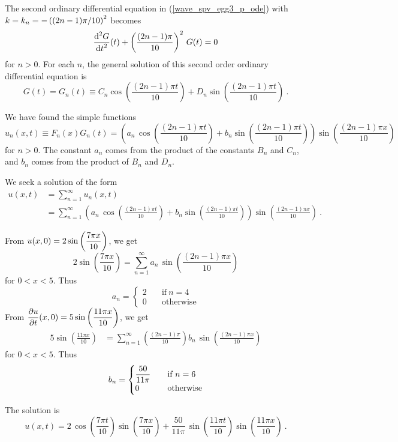 \begin{egg}
The second ordinary differential equation in (\ref{wave_spv_egg3_p_ode}) with
$\displaystyle k = k_n = -\left((2n-1)\pi/10\right)^2$
becomes
\[
\frac{\displaystyle \mathrm{d}^{2}{G}} {\displaystyle \mathrm{d}{t}^{2}}(t) + \left(\frac{(2n-1)\pi}{10}\right)^2\,G(t) = 0
\]
for $n>0$.  For each $n$, the general solution
of this second order ordinary differential equation is
\[
G(t) = G_n(t) \equiv C_n \cos\left(\frac{(2n-1)\pi t}{10}\right)
+ D_n \sin\left(\frac{(2n-1)\pi t}{10}\right) \ .
\]

We have found the simple functions
\[
u_n(x,t) \equiv F_n(x)G_n(t) = \left( a_n\,
\cos\left(\frac{(2n-1)\pi t}{10}\right) + b_n
\sin\left(\frac{(2n-1)\pi t}{10}\right) \right)
\sin\left(\frac{(2n-1)\pi x}{10}\right)
\]
for $n>0$.  The constant $a_n$ comes from the product of the constants
$B_n$ and $C_n$, and $b_n$ comes from the product of $B_n$ and $D_n$.

We seek a solution of the form
\begin{align*}
u(x,t) &= \sum_{n=1}^\infty u_n(x,t) \\
&= \sum_{n=1}^\infty \left( a_n\, \cos\left(\frac{(2n-1)\pi t}{10}\right)
 + b_n \sin\left(\frac{(2n-1)\pi t}{10}\right) \right)
\sin\left(\frac{(2n-1)\pi x}{10}\right) \ .
\end{align*}

From $\displaystyle u(x,0) = 2 \sin\left(\frac{7 \pi x}{10}\right)$, we get
\[
2 \sin\left(\frac{7 \pi x}{10}\right)
= \sum_{n=1}^\infty a_n\,\sin\left(\frac{(2n-1)\pi x}{10}\right)
\]
for $0<x<5$.  Thus
\[
a_n =
\begin{cases}
2 & \quad \text{if} \ n=4 \\
0 & \quad \text{otherwise}
\end{cases}
\]
From $\displaystyle \frac{\partial{u}}{\partial t}(x,0)
= 5 \sin\left(\frac{11\pi x}{10}\right)$, we get
\begin{align*}
5 \sin\left(\frac{11\pi x}{10}\right)
& = \sum_{n=1}^\infty \left(\frac{(2n-1)\pi}{10}\right) b_n\,
\sin\left(\frac{(2n-1)\pi x}{10}\right)
\end{align*}
for $0<x<5$.  Thus
\[
b_n =
\begin{cases}
\displaystyle \frac{50}{11\pi} & \quad \text{if} \ n=6 \\
0 & \quad \text{otherwise}
\end{cases}
\]

The solution is
\[
u(x,t) = 2\, \cos\left(\frac{7\pi t}{10}\right)
\sin\left(\frac{7\pi x}{10}\right)
+\frac{50}{11\pi} \, \sin
\left(\frac{11\pi t}{10}\right) \sin\left(\frac{11\pi x}{10}\right) \ .
\]
\end{egg}

